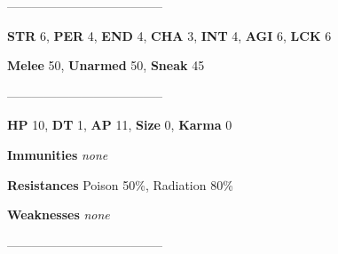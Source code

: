 \documentclass[11pt,a4paper,twocolumn]{book}
\begin{document}
%		
%	
%		

	--------------------------------------
	
	\noindent
	\textbf{STR} 6, \textbf{PER} 4, \textbf{END} 4, \textbf{CHA} 3, \textbf{INT} 4, \textbf{AGI} 6, \textbf{LCK} 6
	
	\noindent
	\textbf{Melee} 50, \textbf{Unarmed} 50, \textbf{Sneak} 45
	
	--------------------------------------
	
	\noindent
	\textbf{HP} 10, \textbf{DT} 1, \textbf{AP} 11, \textbf{Size} 0, \textbf{Karma} 0
	
	
	\noindent
	\textbf{Immunities} \emph{none} %
	
	\noindent
	\textbf{Resistances} Poison 50\%, Radiation 80\%%
	
	\noindent
	\textbf{Weaknesses} \emph{none}%
	
	--------------------------------------
	
\end{document}

